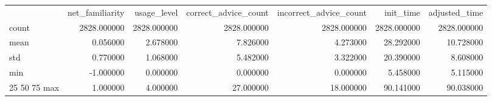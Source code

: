 \begin{tabular}{lrrrrrr}
 & net_familiarity & usage_level & correct_advice_count & incorrect_advice_count & init_time & adjusted_time \\
count & 2828.000000 & 2828.000000 & 2828.000000 & 2828.000000 & 2828.000000 & 2828.000000 \\
mean & 0.056000 & 2.678000 & 7.826000 & 4.273000 & 28.292000 & 10.728000 \\
std & 0.770000 & 1.068000 & 5.482000 & 3.322000 & 20.390000 & 8.608000 \\
min & -1.000000 & 0.000000 & 0.000000 & 0.000000 & 5.458000 & 5.115000 \\
25%
50%
75%
max & 1.000000 & 4.000000 & 27.000000 & 18.000000 & 90.141000 & 90.038000 \\
\end{tabular}
